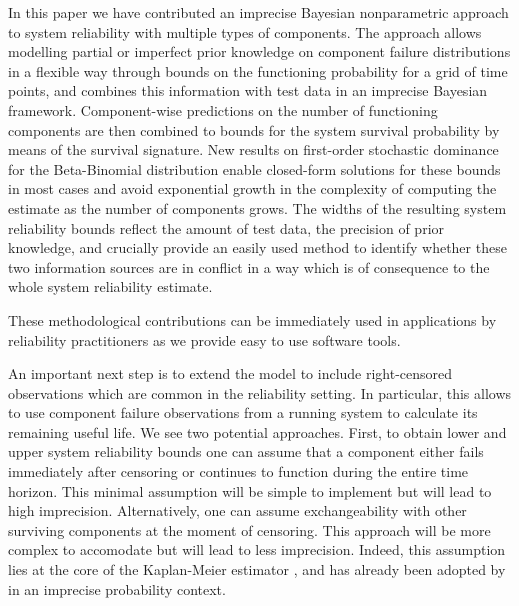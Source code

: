 \documentclass[12pt, a4paper]{elsarticle}
\begin{document}
In this paper we have contributed an imprecise Bayesian nonparametric approach
to system reliability with multiple types of components.
The approach allows modelling partial or imperfect prior knowledge on component failure distributions
in a flexible way through bounds on the functioning probability for a grid of time points, 
and combines this information with test data in an imprecise Bayesian framework.
Component-wise predictions on the number of functioning components
are then combined to bounds for the system survival probability by means of the survival signature.
New results on first-order stochastic dominance for the Beta-Binomial distribution
enable closed-form solutions for these bounds in most cases and 
avoid exponential growth in the complexity of computing the estimate
as the number of components grows.
The widths of the resulting system reliability bounds
reflect the amount of test data, the precision of prior knowledge,
and crucially provide an easily used method to identify 
whether these two information sources are in conflict in a
way which is of consequence to the whole system reliability
estimate.

These methodological contributions can be immediately used in
applications by reliability practitioners as %
we provide easy to use software tools.

An important next step is to extend the model to include right-censored observations which are common in the reliability setting.
In particular, this allows to use component failure observations from a running system
to calculate its remaining useful life.
We see two potential approaches.
First, to obtain lower and upper system reliability bounds 
one can assume that a component either fails immediately after censoring or
continues to function during the entire time horizon.
This minimal assumption will be simple to implement but will lead to high imprecision.
Alternatively, one can assume exchangeability with other surviving components at the moment of censoring.
This approach will be more complex to accomodate but will lead to less imprecision.
Indeed, this assumption lies at the core of the Kaplan-Meier estimator \citep{1958:kaplan-meier},
and has already been adopted by \citet{2004:coolen-yan} in an imprecise probability context.
\end{document}
